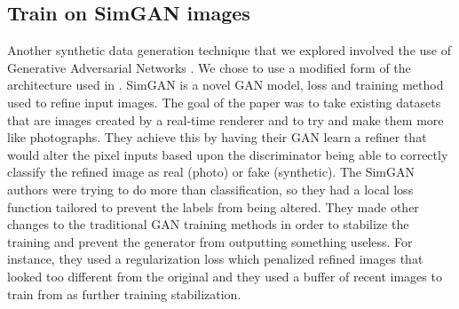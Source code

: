 \documentclass[10pt,twocolumn,letterpaper]{article}
\begin{document}
\subsection{Train on SimGAN images}

Another synthetic data generation technique that we explored involved the use of Generative Adversarial Networks \cite{2014arXiv1409.7495G}.  We chose to use a modified form of the architecture used in \cite{DBLP:journals/corr/ShrivastavaPTSW16}.   SimGAN is a novel GAN\cite{goodfellow} model, loss and training method used to refine input images.  The goal of the paper was to take existing datasets that are images created by a real-time renderer and to try and make them more like photographs. They achieve this by having their GAN learn a refiner that would alter the pixel inputs based upon the discriminator being able to correctly classify the refined image as real (photo) or fake (synthetic).  The SimGAN authors were trying to do more than classification, so they had a local loss function tailored to prevent the labels from being altered.  They made other changes to the traditional GAN training methods in order to stabilize the training and prevent the generator from outputting something useless.  For instance, they used a regularization loss which penalized refined images that looked too different from the original and they used a buffer of recent images to train from as further training stabilization.
\end{document}
